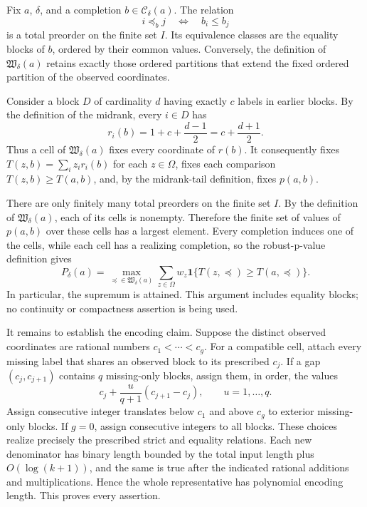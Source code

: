 Fix \(a\), \(\delta\), and a completion \(b\in\mathcal C_\delta(a)\).  The relation
\[
i\preceq_b j\quad\Longleftrightarrow\quad b_i\le b_j
\]
is a total preorder on the finite set \(I\).  Its equivalence classes are the equality blocks of \(b\), ordered by their common values.  Conversely, the definition of \(\mathfrak W_\delta(a)\) retains exactly those ordered partitions that extend the fixed ordered partition of the observed coordinates.

Consider a block \(D\) of cardinality \(d\) having exactly \(c\) labels in earlier blocks.  By the definition of the midrank, every \(i\in D\) has
\[
r_i(b)=1+c+\frac{d-1}{2}=c+\frac{d+1}{2}.
\]
Thus a cell of \(\mathfrak W_\delta(a)\) fixes every coordinate of \(r(b)\).  It consequently fixes \(T(z,b)=\sum_i z_i r_i(b)\) for each \(z\in\Omega\), fixes each comparison \(T(z,b)\ge T(a,b)\), and, by the midrank-tail definition, fixes \(p(a,b)\).

There are only finitely many total preorders on the finite set \(I\).  By the definition of \(\mathfrak W_\delta(a)\), each of its cells is nonempty.  Therefore the finite set of values of \(p(a,b)\) over these cells has a largest element.  Every completion induces one of the cells, while each cell has a realizing completion, so the robust-p-value definition gives
\[
P_\delta(a)
=\max_{\preceq\in\mathfrak W_\delta(a)}
  \sum_{z\in\Omega}w_z
  \mathbf 1\{T(z,\preceq)\ge T(a,\preceq)\}.
\]
In particular, the supremum is attained.  This argument includes equality blocks; no continuity or compactness assertion is being used.

It remains to establish the encoding claim.  Suppose the distinct observed coordinates are rational numbers \(c_1<\cdots<c_g\).  For a compatible cell, attach every missing label that shares an observed block to its prescribed \(c_j\).  If a gap \((c_j,c_{j+1})\) contains \(q\) missing-only blocks, assign them, in order, the values
\[
c_j+\frac{u}{q+1}(c_{j+1}-c_j),\qquad u=1,\ldots,q.
\]
Assign consecutive integer translates below \(c_1\) and above \(c_g\) to exterior missing-only blocks.  If \(g=0\), assign consecutive integers to all blocks.  These choices realize precisely the prescribed strict and equality relations.  Each new denominator has binary length bounded by the total input length plus \(O(\log(k+1))\), and the same is true after the indicated rational additions and multiplications.  Hence the whole representative has polynomial encoding length.  This proves every assertion.

